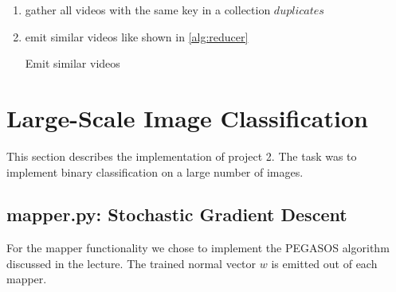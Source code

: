\documentclass[a4paper, 11pt]{article}
\begin{document}
\begin{enumerate}

\item gather all videos with the same key in a collection $duplicates$
\item emit similar videos like shown in \autoref{alg:reducer}


\begin{algorithm}
\caption{Emit similar videos}\label{alg:reducer}
\begin{algorithmic} 








\ENDIF

\ENDIF

\ENDFOR

\ENDFOR

\end{algorithmic} 
\end{algorithm}



\end{enumerate}


\section{Large-Scale Image Classification}

This section describes the implementation of project 2. The task was to
implement binary classification on a large number of images.

\subsection{mapper.py: Stochastic Gradient Descent}

For the mapper functionality we chose to implement the PEGASOS
\cite{shalev2011pegasos} algorithm discussed in the lecture. The trained normal
vector $w$ is emitted out of each mapper.
\end{document}
